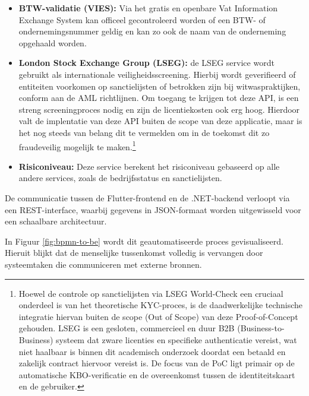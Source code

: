 \begin{enumerate}
\begin{itemize}
{Dit gebeurt via een .NET backend die fungeert als tussenlaag tussen de mobiele applicatie en de externe databron. 
Deze architectuur voorkomt directe blootstelling van externe endpoints en laat toe om bijkomende validatielogica (zoals risicoscores) centraal te beheren.}
        \item \textbf{BTW-validatie (VIES):} Via het gratis en openbare Vat Information Exchange System kan officeel gecontroleerd worden of een BTW- of ondernemingsnummer geldig en kan zo ook de naam van de onderneming opgehaald worden.
        \item \textbf{London Stock Exchange Group (LSEG):} de LSEG service wordt gebruikt als internationale veiligheidsscreening. Hierbij wordt geverifieerd of entiteiten voorkomen op sanctielijsten of betrokken zijn bij witwaspraktijken, conform aan de AML richtlijnen.
        Om toegang te krijgen tot deze API, is een streng screeningproces nodig en zijn de licentiekosten ook erg hoog. Hierdoor valt de implentatie van deze API buiten de scope van deze applicatie, maar is het nog steeds van belang dit te vermelden om in de toekomst dit zo fraudeveilig mogelijk te maken.\footnote{Hoewel de controle op sanctielijsten via LSEG World-Check een cruciaal onderdeel is van het theoretische KYC-proces, 
is de daadwerkelijke technische integratie hiervan buiten de scope (Out of Scope) van deze Proof-of-Concept gehouden. 
LSEG is een gesloten, commercieel en duur B2B (Business-to-Business) systeem dat zware licenties en specifieke authenticatie vereist, 
wat niet haalbaar is binnen dit academisch onderzoek doordat een betaald en zakelijk contract hiervoor vereist is. 
De focus van de PoC ligt primair op de automatische KBO-verificatie en de overeenkomst tussen de identiteitskaart en de gebruiker.
}
        \item \textbf{Risiconiveau:} Deze service berekent het risiconiveau gebaseerd op alle andere services, zoals de bedrijfsstatus en sanctielijsten.
\end{itemize}

De communicatie tussen de Flutter-frontend en de .NET-backend verloopt via een REST-interface, waarbij gegevens in JSON-formaat worden uitgewisseld voor een schaalbare architectuur.

\end{enumerate}

In Figuur \ref{fig:bpmn-to-be} wordt dit geautomatiseerde proces gevisualiseerd. Hieruit blijkt dat de menselijke tussenkomst volledig is vervangen door systeemtaken die communiceren met externe bronnen.

